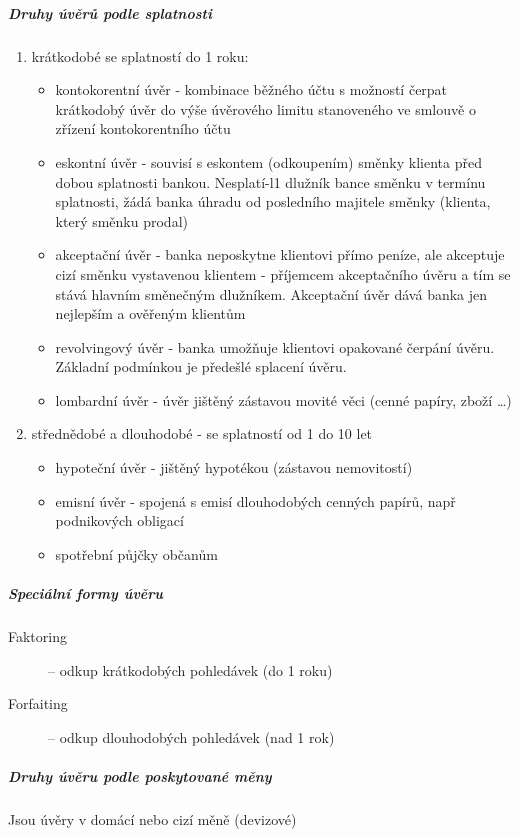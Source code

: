 \subparagraph{Druhy úvěrů podle splatnosti}
\begin{enumerate}
    \item krátkodobé se splatností do 1 roku:
        \begin{itemize}
            \item kontokorentní úvěr - kombinace běžného účtu s možností čerpat krátkodobý úvěr do výše úvěrového limitu stanoveného ve smlouvě o zřízení kontokorentního účtu
            \item eskontní úvěr - souvisí s eskontem (odkoupením) směnky klienta před dobou splatnosti bankou. Nesplatí-l1 dlužník bance směnku v termínu splatnosti, žádá banka úhradu od posledního majitele směnky (klienta, který směnku prodal)
            \item akceptační úvěr - banka neposkytne klientovi přímo peníze, ale akceptuje cizí směnku vystavenou klientem - příjemcem akceptačního úvěru a tím se stává hlavním směnečným dlužníkem. Akceptační úvěr dává banka jen nejlepším a ověřeným klientům
            \item revolvingový úvěr - banka umožňuje klientovi opakované čerpání úvěru. Základní podmínkou je předešlé splacení úvěru.
            \item lombardní úvěr - úvěr jištěný zástavou movité věci (cenné papíry, zboží \ldots)
        \end{itemize}
    \item střednědobé a dlouhodobé - se splatností od 1 do 10 let
        \begin{itemize}
            \item hypoteční úvěr - jištěný hypotékou (zástavou nemovitostí)
            \item emisní úvěr - spojená s emisí dlouhodobých cenných papírů, např podnikových obligací
            \item spotřební půjčky občanům
        \end{itemize}
\end{enumerate}

\subparagraph{Speciální formy úvěru}
\begin{description}
    \item[Faktoring] -- odkup krátkodobých pohledávek (do 1 roku)
    \item[Forfaiting] -- odkup dlouhodobých pohledávek (nad 1 rok)
\end{description}

\subparagraph{Druhy úvěru podle poskytované měny}
Jsou úvěry v domácí nebo cizí měně (devizové)

